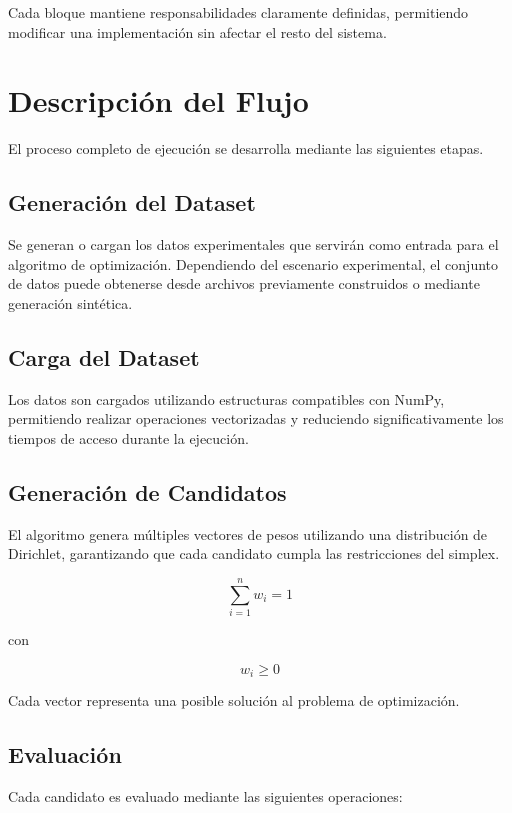 Cada bloque mantiene responsabilidades claramente definidas, permitiendo modificar una implementación sin afectar el resto del sistema.

\section{Descripción del Flujo}

El proceso completo de ejecución se desarrolla mediante las siguientes etapas.

\subsection{Generación del Dataset}

Se generan o cargan los datos experimentales que servirán como entrada para el algoritmo de optimización. Dependiendo del escenario experimental, el conjunto de datos puede obtenerse desde archivos previamente construidos o mediante generación sintética.

\subsection{Carga del Dataset}

Los datos son cargados utilizando estructuras compatibles con NumPy, permitiendo realizar operaciones vectorizadas y reduciendo significativamente los tiempos de acceso durante la ejecución.

\subsection{Generación de Candidatos}

El algoritmo genera múltiples vectores de pesos utilizando una distribución de Dirichlet, garantizando que cada candidato cumpla las restricciones del simplex.

\[
\sum_{i=1}^{n} w_i = 1
\]

con

\[
w_i \geq 0
\]

Cada vector representa una posible solución al problema de optimización.

\subsection{Evaluación}

Cada candidato es evaluado mediante las siguientes operaciones:


